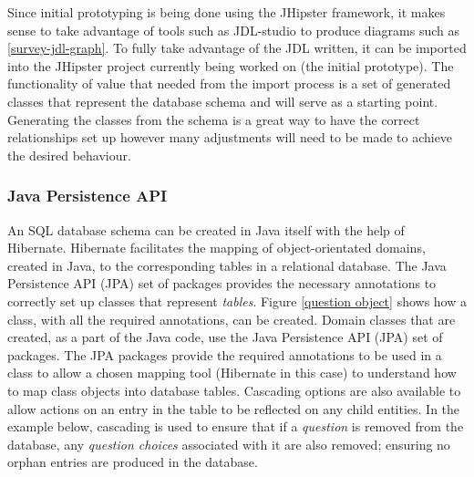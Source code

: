 Since initial prototyping is being done using the JHipster framework, it makes sense to take advantage of tools such as 
JDL-studio to produce diagrams such as \ref{survey-jdl-graph}.
To fully take advantage of the JDL written, it can be imported into the JHipster project currently being worked on (the initial prototype). 
The functionality of value that needed from the import process is a set of generated classes that represent
the database schema and will serve as a starting point.
Generating the classes from the schema is a great way to have the correct relationships set up however many adjustments will
need to be made to achieve the desired behaviour.

\subsubsection{Java Persistence API}
An SQL database schema can be created in Java itself with the help of Hibernate. %
Hibernate facilitates the mapping of object-orientated domains, created in Java, to the corresponding tables in a relational database.
The Java Persistence API (JPA) set of packages provides the necessary annotations to correctly set up classes that represent \emph{tables}.
Figure \ref{question object} shows how a class, with all the required annotations, can be created.
Domain classes that are created, as a part of the Java code, use the Java Persistence API (JPA) set of packages.
The JPA packages provide the required annotations to be used in a class to allow a chosen mapping tool (Hibernate in this case) to understand how
to map class objects into database tables.
Cascading options are also available to allow actions on an entry in the table to be reflected on any child entities.
In the example below, cascading is used to ensure that if a \emph{question} is removed from the database, any \emph{question choices} associated
with it are also removed; ensuring no orphan entries are produced in the database.

